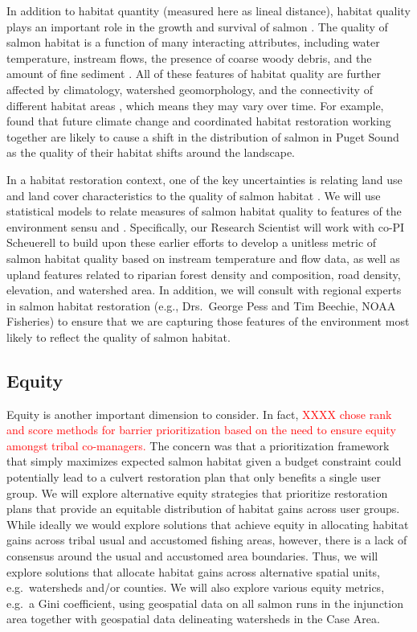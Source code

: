 In addition to habitat quantity (measured here as lineal distance), habitat quality plays an important role in the growth and survival of salmon \citep{Pess_2011}. The quality of salmon habitat is a function of many interacting attributes, including water temperature, instream flows, the presence of coarse woody debris, and the amount of fine sediment \citep{Bartz_2006,Isaak_2007}. All of these features of habitat quality are further affected by climatology, watershed geomorphology, and the connectivity of different habitat areas \citep{Caissie_2006, Rodeles_2019}, which means they may vary over time. For example, \citet{Battin_2007} found that future climate change and coordinated habitat restoration working together are likely to cause a shift in the distribution of salmon in Puget Sound as the quality of their habitat shifts around the landscape.

In a habitat restoration context, one of the key uncertainties is relating land use and land cover characteristics to the quality of salmon habitat \citep{Bartz_2006, Jorgensen_2009}. We will use statistical models to relate measures of salmon habitat quality to features of the environment sensu \citet{Bartz_2006} and \citet{Jorgensen_2009}. Specifically, our Research Scientist will work with co-PI Scheuerell to build upon these earlier efforts to develop a unitless metric of salmon habitat quality based on instream temperature and flow data, as well as upland features related to riparian forest density and composition, road density, elevation, and watershed area. In addition, we will consult with regional experts in salmon habitat restoration (e.g., Drs.\ George Pess and Tim Beechie, NOAA Fisheries) to ensure that we are capturing those features of the environment most likely to reflect the quality of salmon habitat.

\subsection*{Equity}

Equity is another important dimension to consider. In fact, \textcolor{red}{XXXX chose rank and score methods for barrier prioritization based on the need to ensure equity amongst tribal co-managers.} The concern was that a prioritization framework that simply maximizes expected salmon habitat given a budget constraint could potentially lead to a culvert restoration plan that only benefits a single user group. We will explore alternative equity strategies that prioritize restoration plans that provide an equitable distribution of habitat gains across user groups. While ideally we would explore solutions that achieve equity in allocating habitat gains across tribal usual and accustomed fishing areas, however, there is a lack of consensus around the usual and accustomed area boundaries. Thus, we will explore solutions that allocate habitat gains across alternative spatial units, e.g.\ watersheds and/or counties. We will also explore various equity metrics, e.g.\ a Gini coefficient, using geospatial data on all salmon runs in the injunction area together with geospatial data delineating watersheds in the Case Area. 

